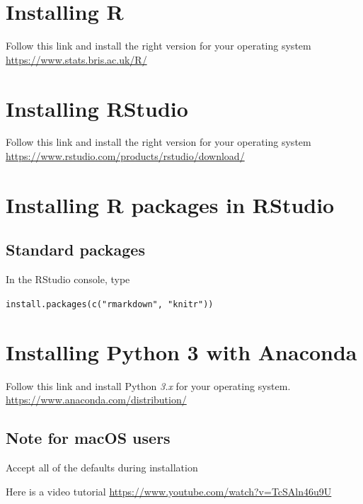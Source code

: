 \documentclass[
]{book}
\begin{document}
\hypertarget{installing-r}{%
\section{Installing R}\label{installing-r}}

Follow this link and install the right version for your operating system \url{https://www.stats.bris.ac.uk/R/}

\hypertarget{installing-rstudio}{%
\section{Installing RStudio}\label{installing-rstudio}}

Follow this link and install the right version for your operating system \url{https://www.rstudio.com/products/rstudio/download/}

\hypertarget{installing-r-packages-in-rstudio}{%
\section{Installing R packages in RStudio}\label{installing-r-packages-in-rstudio}}

\hypertarget{standard-packages}{%
\subsection{Standard packages}\label{standard-packages}}

In the RStudio console, type

\texttt{install.packages(c("rmarkdown",\ "knitr"))}

\hypertarget{installing-python-3-with-anaconda}{%
\section{Installing Python 3 with Anaconda}\label{installing-python-3-with-anaconda}}

Follow this link and install Python \emph{3.x} for your operating system. \url{https://www.anaconda.com/distribution/}

\hypertarget{note-for-macos-users}{%
\subsection{Note for macOS users}\label{note-for-macos-users}}

Accept all of the defaults during installation

Here is a video tutorial \url{https://www.youtube.com/watch?v=TcSAln46u9U}
\end{document}
